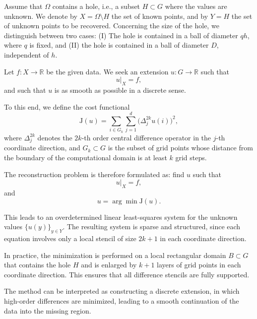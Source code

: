 \documentclass[11pt,oneside,reqno]{amsart}
\theoremstyle{plain}
\numberwithin{equation}{section}
\begin{document}
Assume that $\Omega$ contains a hole,
i.e., a subset $H\subset G$ where the values are unknown.
We denote by $X=\Omega\setminus H$ the set of known points,
and by $Y=H$ the set of unknown points to be recovered. Concerning the size of the hole,
we distinguish between two cases:
(I) The hole is contained in a ball
of diameter $q h$, where $q$ is fixed,
and (II) the hole is contained in a ball
of diameter $D$,
independent of $h$.

\medskip

\noindent
Let $f:X\to\mathbb{R}$ be the given data.
We seek an extension $u:G\to\mathbb{R}$ such that
\[
u|_X = f,
\]
and such that $u$ is as smooth as possible
in a discrete sense.

\medskip

\noindent
To this end, we define the cost functional
\begin{equation}
    \label{COST}
\mathrm{J}(u)
=
\sum_{i\in G_k}
\sum_{j=1}^d
\bigl(\Delta_j^{2k} u(i)\bigr)^2,
\end{equation}
where $\Delta_j^{2k}$ denotes the $2k$-th order
central difference operator in the $j$-th coordinate direction,
and $G_k\subset G$ is the subset of grid points
whose distance from the boundary of the computational domain
is at least $k$ grid steps.

\medskip

\noindent
The reconstruction problem is therefore formulated as:
find $u$ such that
\begin{equation}
\label{uXf}
u|_X = f,
\end{equation}
and
\begin{equation}
\label{argminCOST}
u = \arg\min \mathrm{J}(u).
\end{equation}

\medskip

\noindent
This leads to an overdetermined linear least-squares system
for the unknown values $\{u(y)\}_{y\in Y}$.
The resulting system is sparse and structured,
since each equation involves only a local stencil
of size $2k+1$ in each coordinate direction.

\medskip

\noindent
In practice, the minimization is performed
on a local rectangular domain $B\subset G$
that contains the hole $H$ and is enlarged
by $k+1$ layers of grid points in each coordinate direction.
This ensures that all difference stencils are fully supported.

\medskip

\noindent
The method can be interpreted as constructing
a discrete extension,
in which high-order differences are minimized,
leading to a smooth continuation of the data
into the missing region.
\end{document}
